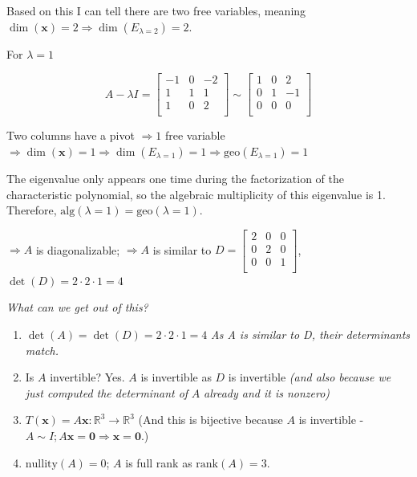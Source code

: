 \documentclass[12pt]{article}
\theoremstyle{plain}
\theoremstyle{remark}
\theoremstyle{definition}
\begin{document}
Based on this I can tell there are two free variables, meaning
\(\dim\left( \mathbf{x} \right) = 2 \Rightarrow \dim\left( E_{\lambda = 2} \right) = 2\).

For \(\lambda = 1\)

\[A - \lambda I = \begin{bmatrix}
 - 1 & 0 & - 2 \\
1 & 1 & 1 \\
1 & 0 & 2 \\
\end{bmatrix}\sim\begin{bmatrix}
1 & 0 & 2 \\
0 & 1 & - 1 \\
0 & 0 & 0 \\
\end{bmatrix}\]

Two columns have a pivot \(\Rightarrow 1\) free variable
\(\Rightarrow \dim\left( \mathbf{x} \right) = 1 \Rightarrow \dim\left( E_{\lambda = 1} \right) = 1 \Rightarrow \text{geo}\left( E_{\lambda = 1} \right) = 1\)

The eigenvalue only appears one time during the factorization of the
characteristic polynomial, so the algebraic multiplicity of this
eigenvalue is 1. Therefore,
\(\text{alg}(\lambda = 1) = \text{geo}(\lambda = 1)\).

\(\Rightarrow A\) is diagonalizable; \(\Rightarrow A\) is similar to
\(D = \begin{bmatrix}
2 & 0 & 0 \\
0 & 2 & 0 \\
0 & 0 & 1 \\
\end{bmatrix}\), \(\det(D) = 2 \cdot 2 \cdot 1 = 4\)

\emph{What can we get out of this?}

\begin{enumerate}
\def\labelenumi{\arabic{enumi}.}
\item
  \(\det(A) = \det(D) = 2 \cdot 2 \cdot 1 = 4\) \emph{As A is similar to
  D, their determinants match.}
\item
  Is \(A\) invertible? Yes. \(A\) is invertible as \(D\) is invertible
  \emph{(and also because we just computed the determinant of} \(A\)
  \emph{already and it is nonzero)}
\item
  \(T\left( \mathbf{x} \right) = A\mathbf{x}:\mathbb{R}^{3} \rightarrow \mathbb{R}^{3}\)
  (And this is bijective because \(A\) is invertible -
  \(A\sim I;A\mathbf{x} = \mathbf{0} \Rightarrow \mathbf{x} = \mathbf{0}\).)
\item
  \(\text{nullity}(A) = 0\); \(A\) is full rank as
  \(\text{rank}(A) = 3\).
\end{enumerate}
\end{document}
